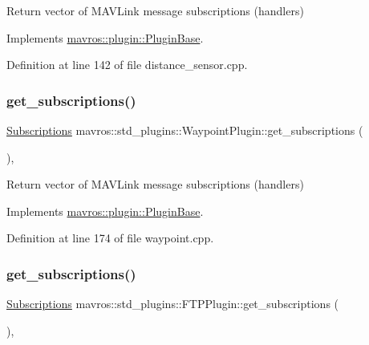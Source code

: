 Return vector of M\+A\+V\+Link message subscriptions (handlers) 



Implements \mbox{\hyperlink{group__plugin_gaf4e23fec6d7436a62cbf0942a2e5791c}{mavros\+::plugin\+::\+Plugin\+Base}}.



Definition at line 142 of file distance\+\_\+sensor.\+cpp.

\mbox{\label{group__plugin_ga27f42c57511291aaaf46e268e4833ed2}} 
\subsubsection{\texorpdfstring{get\_subscriptions()}{get\_subscriptions()}\hspace{0.1cm}{\footnotesize\ttfamily [37/41]}}
{\footnotesize\ttfamily \mbox{\hyperlink{group__plugin_ga8967d61fc77040e0c3ea5a4585d62a09}{Subscriptions}} mavros\+::std\+\_\+plugins\+::\+Waypoint\+Plugin\+::get\+\_\+subscriptions (\begin{DoxyParamCaption}{ }\end{DoxyParamCaption})\hspace{0.3cm}{\ttfamily [inline]}, {\ttfamily [virtual]}}



Return vector of M\+A\+V\+Link message subscriptions (handlers) 



Implements \mbox{\hyperlink{group__plugin_gaf4e23fec6d7436a62cbf0942a2e5791c}{mavros\+::plugin\+::\+Plugin\+Base}}.



Definition at line 174 of file waypoint.\+cpp.

\mbox{\label{group__plugin_ga75b1dc5d6bd1dc976c4a974b93d03e92}} 
\subsubsection{\texorpdfstring{get\_subscriptions()}{get\_subscriptions()}\hspace{0.1cm}{\footnotesize\ttfamily [38/41]}}
{\footnotesize\ttfamily \mbox{\hyperlink{group__plugin_ga8967d61fc77040e0c3ea5a4585d62a09}{Subscriptions}} mavros\+::std\+\_\+plugins\+::\+F\+T\+P\+Plugin\+::get\+\_\+subscriptions (\begin{DoxyParamCaption}{ }\end{DoxyParamCaption})\hspace{0.3cm}{\ttfamily [inline]}, {\ttfamily [virtual]}}




